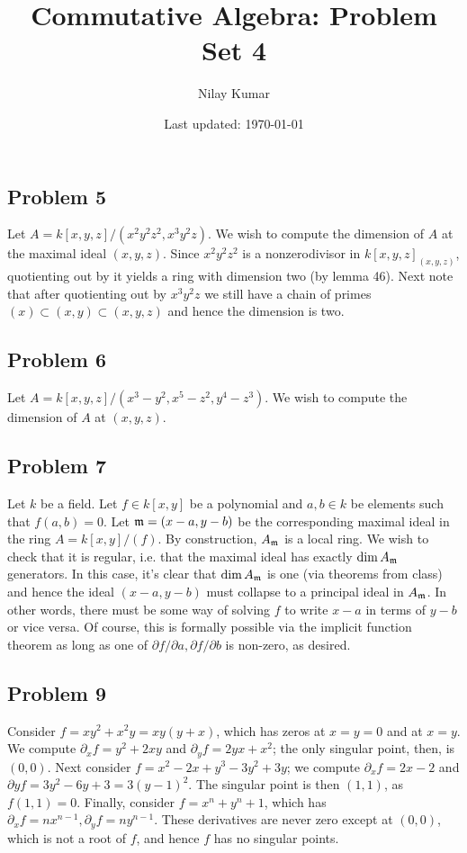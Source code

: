 \documentclass{../../mathnotes}
\title{Commutative Algebra: Problem Set 4}
\author{Nilay Kumar}
\date{Last updated: \today}
\begin{document}
\maketitle


\subsection*{Problem 5}

Let $A=k[x,y,z]/(x^2y^2z^2, x^3y^2z)$. We wish to compute the dimension of $A$ at the maximal ideal $(x,y,z)$.
Since $x^2y^2z^2$ is a nonzerodivisor in $k[x,y,z]_{(x,y,z)}$, quotienting out by it yields a ring with dimension two (by lemma 46).
Next note that after quotienting out by $x^3y^2z$ we still have a chain of primes $(x)\subset (x,y)\subset (x,y,z)$ and hence the
dimension is two.


\subsection*{Problem 6}

Let $A=k[x,y,z]/(x^3-y^2,x^5-z^2,y^4-z^3)$. We wish to compute the dimension of $A$ at $(x,y,z)$.


\subsection*{Problem 7}

Let $k$ be a field. Let $f\in k[x,y]$ be a polynomial and $a,b\in k$ be elements such that $f(a,b)=0$.
Let $\mathfrak m=(x-a,y-b)$ be the corresponding maximal ideal in the ring $A=k[x,y]/(f)$. By construction, $A_\mathfrak m$ is a local ring.
We wish to check that it is regular, i.e. that the maximal ideal has exactly $\dim A_\mathfrak m$ generators. In this case,
it's clear that $\dim A_\mathfrak m$ is one (via theorems from class) and hence the ideal $(x-a,y-b)$ must collapse to a principal
ideal in $A_\mathfrak m$. In other words, there must be some way of solving $f$ to write $x-a$ in terms of $y-b$ or vice versa. Of
course, this is formally possible via the implicit function theorem as long as one of $\partial f/\partial a,\partial f/\partial b$
is non-zero, as desired.

\subsection*{Problem 9}

Consider $f=xy^2+x^2y=xy(y+x)$, which has zeros at $x=y=0$ and at $x=y$. We compute $\partial_xf=y^2+2xy$ and $\partial_yf=2yx+x^2$; the only singular point, then,
is $(0,0)$. Next consider $f=x^2-2x+y^3-3y^2+3y$; we compute $\partial_xf=2x-2$ and $\partial yf=3y^2-6y+3=3(y-1)^2$. The singular point is then $(1,1)$,
as $f(1,1)=0$. Finally, consider $f=x^n+y^n+1$, which has $\partial_xf=nx^{n-1}, \partial_yf=ny^{n-1}$. These derivatives are never zero except at $(0,0)$, which
is not a root of $f$, and hence $f$ has no singular points.
\end{document}
